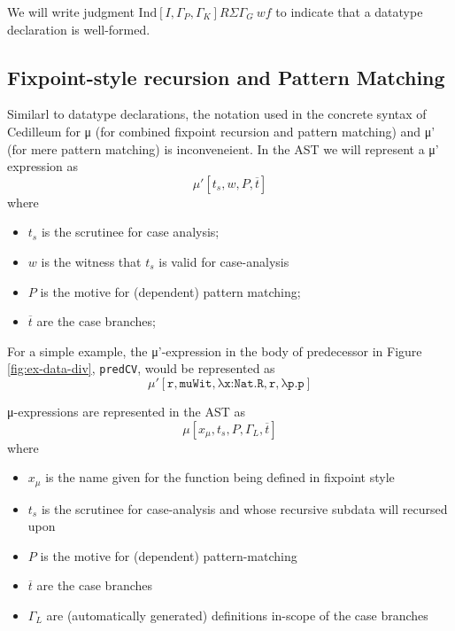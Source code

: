 \documentclass{article}
\newcommand{\indsche}[3]{\ensuremath{\text{Ind}[#1,#2,#3]}}
\newcommand{\mupsche}[4]{μ'[#1,#2,#3,#4]}
\newcommand{\musche}[5]{μ[#1,#2,#3,#4,#5]}
\newcommand{\vars}[1]{{\overline{#1}}}
\begin{document}
We will write judgment $\indsche{I}{\Gamma_P}{\Gamma_K}{R}{\Sigma}{\Gamma_G}\ wf$
to indicate that a datatype declaration is well-formed.

\subsection{Fixpoint-style recursion and Pattern Matching}
Similarl to datatype declarations, the notation used in the concrete syntax of
Cedilleum for μ (for combined fixpoint recursion and pattern matching) and μ'
(for mere pattern matching) is inconveneient. In the AST we will represent a μ'
expression as
\[
  \mupsche{t_s}{w}{P}{\vars{t}}
\]
\noindent where
\begin{itemize}
\item $t_s$ is the scrutinee for case analysis;
\item $w$ is the witness that $t_s$ is valid for case-analysis
\item $P$ is the motive for (dependent) pattern matching;
\item $\vars{t}$ are the case branches;
\end{itemize}

For a simple example, the μ'-expression in the body of predecessor in Figure
\ref{fig:ex-data-div}, \texttt{predCV}, would be represented as
\[
  \mupsche{\texttt{r}}{\texttt{muWit}}{\texttt{λx:Nat.R}}{
    \texttt{r}, \texttt{λp.p}
  }
\]

μ-expressions are represented in the AST as
\[
  \musche{x_μ}{t_s}{P}{\Gamma_L}{\vars{t}}
\]
\noindent where
\begin{itemize}
\item $x_{μ}$ is the name given for the function being defined in fixpoint style
\item $t_s$ is the scrutinee for case-analysis and whose recursive subdata will
  recursed upon
\item $P$ is the motive for (dependent) pattern-matching
\item $\vars{t}$ are the case branches
\item $\Gamma_L$ are (automatically generated) definitions in-scope of the case
  branches
\end{itemize}
\end{document}
